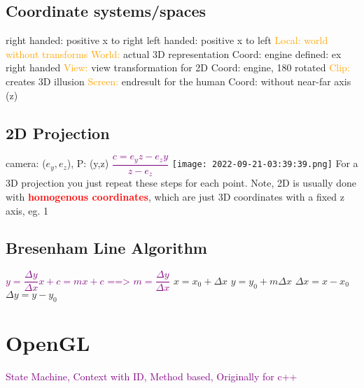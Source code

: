 \documentclass[main.tex,fontsize=12pt,paper=a4,paper=landscape,DIV=calc,]{scrartcl}
\begin{document}
\begin{multicols*}{4}
\subsection{Coordinate systems/spaces}
right handed: positive x to right\newline
left handed: positive x to left\newline
\textcolor{orange}{Local: world without transforms}\newline
\textcolor{orange}{World:} actual 3D representation \newline
Coord: engine defined: ex right handed\newline 
\textcolor{orange}{View:} view transformation for 2D \newline
Coord: engine, 180 rotated\newline
\textcolor{orange}{Clip:} creates 3D illusion\newline
\textcolor{orange}{Screen:} endresult for the human\newline
Coord: without near-far axis (z)

\subsection{2D Projection}
camera: (\(e_y, e_z\)), P: (y,z)\newline
\textcolor{purple}{\(\dfrac{c = e_y z - e_z y}{z - e_z}\)}
\texttt{[image: 2022-09-21-03:39:39.png]}\newline
For a 3D projection you just repeat these steps for each point.\newline
Note, 2D is usually done with \textcolor{red}{\textbf{homogenous coordinates}}, which are just 3D coordinates with a fixed z axis, eg. 1

\subsection{Bresenham Line Algorithm}
\textcolor{purple}{\(y = \dfrac{\Delta y}{\Delta x}x + c = mx + c\) ==> \(m = \dfrac{\Delta y}{\Delta x}\)}\newline
\(x = x_0 + \Delta x\) \(y = y_0 + m\Delta x\) \newline \(\Delta x = x - x_0\) \(\Delta y = y - y_0 \)

\section{OpenGL}
 \textcolor{purple}{State Machine, Context with ID, \newline Method based, Originally for c++}


\end{multicols*}
\end{document}
